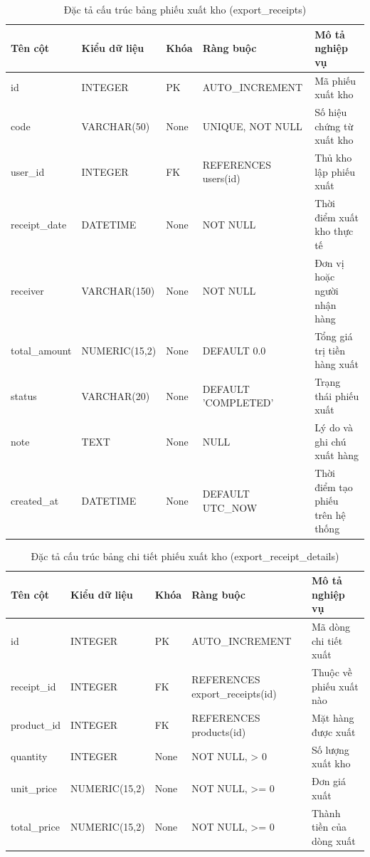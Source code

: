 \begin{table}[h!]
\centering
\caption{Đặc tả cấu trúc bảng phiếu xuất kho (export_receipts)}
\begin{tabular}{|l|l|l|l|l|}
\hline
\rowcolor{tablehead}
\textbf{Tên cột} & \textbf{Kiểu dữ liệu} & \textbf{Khóa} & \textbf{Ràng buộc} & \textbf{Mô tả nghiệp vụ} \\ \hline
id & INTEGER & PK & AUTO\_INCREMENT & Mã phiếu xuất kho \\ \hline
code & VARCHAR(50) & None & UNIQUE, NOT NULL & Số hiệu chứng từ xuất kho \\ \hline
user\_id & INTEGER & FK & REFERENCES users(id) & Thủ kho lập phiếu xuất \\ \hline
receipt\_date & DATETIME & None & NOT NULL & Thời điểm xuất kho thực tế \\ \hline
receiver & VARCHAR(150) & None & NOT NULL & Đơn vị hoặc người nhận hàng \\ \hline
total\_amount & NUMERIC(15,2) & None & DEFAULT 0.0 & Tổng giá trị tiền hàng xuất \\ \hline
status & VARCHAR(20) & None & DEFAULT 'COMPLETED' & Trạng thái phiếu xuất \\ \hline
note & TEXT & None & NULL & Lý do và ghi chú xuất hàng \\ \hline
created\_at & DATETIME & None & DEFAULT UTC\_NOW & Thời điểm tạo phiếu trên hệ thống \\ \hline
\end{tabular}
\end{table}

\begin{table}[h!]
\centering
\caption{Đặc tả cấu trúc bảng chi tiết phiếu xuất kho (export_receipt_details)}
\begin{tabular}{|l|l|l|l|l|}
\hline
\rowcolor{tablehead}
\textbf{Tên cột} & \textbf{Kiểu dữ liệu} & \textbf{Khóa} & \textbf{Ràng buộc} & \textbf{Mô tả nghiệp vụ} \\ \hline
id & INTEGER & PK & AUTO\_INCREMENT & Mã dòng chi tiết xuất \\ \hline
receipt\_id & INTEGER & FK & REFERENCES export\_receipts(id) & Thuộc về phiếu xuất nào \\ \hline
product\_id & INTEGER & FK & REFERENCES products(id) & Mặt hàng được xuất \\ \hline
quantity & INTEGER & None & NOT NULL, > 0 & Số lượng xuất kho \\ \hline
unit\_price & NUMERIC(15,2) & None & NOT NULL, >= 0 & Đơn giá xuất \\ \hline
total\_price & NUMERIC(15,2) & None & NOT NULL, >= 0 & Thành tiền của dòng xuất \\ \hline
\end{tabular}
\end{table}

